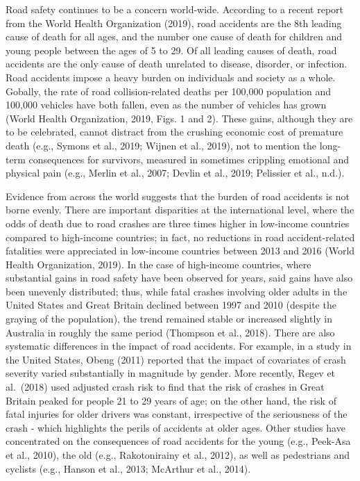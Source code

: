 \documentclass[]{elsarticle} %
\begin{document}
Road safety continues to be a concern world-wide. According to a recent
report from the World Health Organization (2019), road accidents are the
8th leading cause of death for all ages, and the number one cause of
death for children and young people between the ages of 5 to 29. Of all
leading causes of death, road accidents are the only cause of death
unrelated to disease, disorder, or infection. Road accidents impose a
heavy burden on individuals and society as a whole. Gobally, the rate of
road collision-related deaths per 100,000 population and 100,000
vehicles have both fallen, even as the number of vehicles has grown
(World Health Organization, 2019, Figs. 1 and 2). These gains, although
they are to be celebrated, cannot distract from the crushing economic
cost of premature death (e.g., Symons et al., 2019; Wijnen et al.,
2019), not to mention the long-term consequences for survivors, measured
in sometimes crippling emotional and physical pain (e.g., Merlin et al.,
2007; Devlin et al., 2019; Pelissier et al., n.d.).

Evidence from across the world suggests that the burden of road
accidents is not borne evenly. There are important disparities at the
international level, where the odds of death due to road crashes are
three times higher in low-income countries compared to high-income
countries; in fact, no reductions in road accident-related fatalities
were appreciated in low-income countries between 2013 and 2016 (World
Health Organization, 2019). In the case of high-income countries, where
substantial gains in road safety have been observed for years, said
gains have also been unevenly distributed; thus, while fatal crashes
involving older adults in the United States and Great Britain declined
between 1997 and 2010 (despite the graying of the population), the trend
remained stable or increased slightly in Australia in roughly the same
period (Thompson et al., 2018). There are also systematic differences in
the impact of road accidents. For example, in a study in the United
States, Obeng (2011) reported that the impact of covariates of crash
severity varied substantially in magnitude by gender. More recently,
Regev et al.~(2018) used adjusted crash risk to find that the risk of
crashes in Great Britain peaked for people 21 to 29 years of age; on the
other hand, the risk of fatal injuries for older drivers was constant,
irrespective of the seriousness of the crash - which highlights the
perils of accidents at older ages. Other studies have concentrated on
the consequences of road accidents for the young (e.g., Peek-Asa et al.,
2010), the old (e.g., Rakotonirainy et al., 2012), as well as
pedestrians and cyclists (e.g., Hanson et al., 2013; McArthur et al.,
2014).
\end{document}
